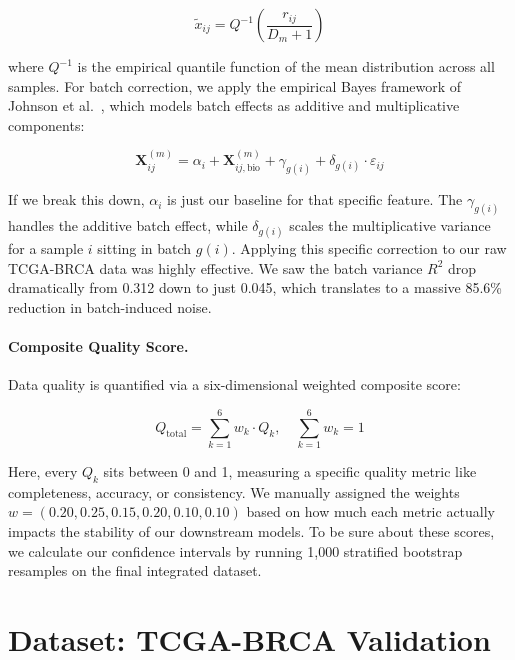 \documentclass[12pt,a4paper,onecolumn]{article}
\begin{document}
\begin{equation}
\tilde{x}_{ij} = Q^{-1}\left(\frac{r_{ij}}{D_m + 1}\right)
\end{equation}

where $Q^{-1}$ is the empirical quantile function of the mean distribution across all samples. For batch correction, we apply the empirical Bayes framework of Johnson et al.~\cite{johnson2007}, which models batch effects as additive and multiplicative components:

\begin{equation}
\mathbf{X}^{(m)}_{ij} = \alpha_i + \mathbf{X}^{(m)}_{ij,\text{bio}} + \gamma_{g(i)} + \delta_{g(i)} \cdot \varepsilon_{ij}
\end{equation}

If we break this down, $\alpha_i$ is just our baseline for that specific feature. The $\gamma_{g(i)}$ handles the additive batch effect, while $\delta_{g(i)}$ scales the multiplicative variance for a sample $i$ sitting in batch $g(i)$. Applying this specific correction to our raw TCGA-BRCA data was highly effective. We saw the batch variance $R^2$ drop dramatically from 0.312 down to just 0.045, which translates to a massive 85.6\% reduction in batch-induced noise.

\paragraph{Composite Quality Score.}
Data quality is quantified via a six-dimensional weighted composite score:

\begin{equation}
Q_{\text{total}} = \sum_{k=1}^{6} w_k \cdot Q_k, \quad \sum_{k=1}^{6} w_k = 1
\end{equation}

Here, every $Q_k$ sits between 0 and 1, measuring a specific quality metric like completeness, accuracy, or consistency. We manually assigned the weights $w = (0.20, 0.25, 0.15, 0.20, 0.10, 0.10)$ based on how much each metric actually impacts the stability of our downstream models. To be sure about these scores, we calculate our confidence intervals by running 1,000 stratified bootstrap resamples on the final integrated dataset.

\section{Dataset: TCGA-BRCA Validation}
\end{document}
